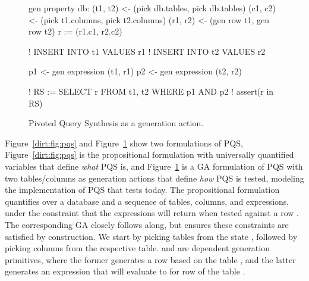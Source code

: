 \begin{figure}[h!]
  \centering

  \begin{gacode}
gen property db:
    (t1, t2) <- (pick db.tables, pick db.tables)
    (c1, c2) <- (pick t1.columns, pick t2.columns)
    (r1, r2) <- (gen row t1, gen row t2)
    r  := (r1.c1, r2.c2)

    ! INSERT INTO t1 VALUES r1
    ! INSERT INTO t2 VALUES r2

    p1 <- gen expression (t1, r1)
    p2 <- gen expression (t2, r2)

    ! RS := SELECT r FROM t1, t2 WHERE p1 AND p2
    ! assert(r in RS)
    \end{gacode}
  \caption{Pivoted Query Synthesis as a generation action.}
  \label{dirt:fig:pqs-ga}
\end{figure}

Figure~\ref{dirt:fig:pqs} and Figure~\ref{dirt:fig:pqs-ga} show two formulations of
PQS, Figure~\ref{dirt:fig:pqs} is the propositional formulation with universally
quantified variables that define \emph{what} PQS is, and Figure~\ref{dirt:fig:pqs-ga}
is a GA formulation of PQS with two tables/columns as generation actions that define
\emph{how} PQS is tested, modeling the implementation of PQS that tests \db{} today.
The propositional formulation quantifies over a database and a sequence of tables,
columns, and expressions, under the constraint that the expressions will return
 when tested against a row . The corresponding GA closely follows
along, but ensures these constraints are satisfied by construction.
%
We start by picking tables  from the state , followed by
picking columns from the respective table.  and 
 are dependent generation primitives, where the former generates a row
based on the table , and the latter generates an expression that will evaluate
to  for row  of the table .

